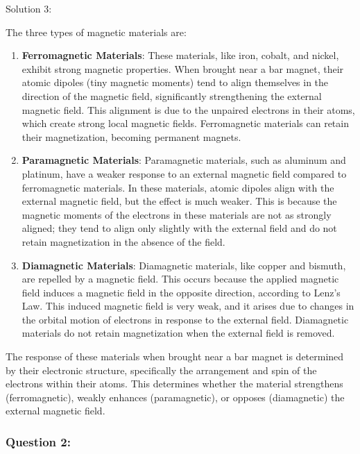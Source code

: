 \documentclass[a4paper,11pt]{article}
\begin{document}
\noindent Solution 3:

The three types of magnetic materials are:

\begin{enumerate}
    \item \textbf{Ferromagnetic Materials}: These materials, like iron, cobalt, and nickel, exhibit strong magnetic properties. When brought near a bar magnet, their atomic dipoles (tiny magnetic moments) tend to align themselves in the direction of the magnetic field, significantly strengthening the external magnetic field. This alignment is due to the unpaired electrons in their atoms, which create strong local magnetic fields. Ferromagnetic materials can retain their magnetization, becoming permanent magnets.
    
    \item \textbf{Paramagnetic Materials}: Paramagnetic materials, such as aluminum and platinum, have a weaker response to an external magnetic field compared to ferromagnetic materials. In these materials, atomic dipoles align with the external magnetic field, but the effect is much weaker. This is because the magnetic moments of the electrons in these materials are not as strongly aligned; they tend to align only slightly with the external field and do not retain magnetization in the absence of the field.
    
    \item \textbf{Diamagnetic Materials}: Diamagnetic materials, like copper and bismuth, are repelled by a magnetic field. This occurs because the applied magnetic field induces a magnetic field in the opposite direction, according to Lenz's Law. This induced magnetic field is very weak, and it arises due to changes in the orbital motion of electrons in response to the external field. Diamagnetic materials do not retain magnetization when the external field is removed.
\end{enumerate}

The response of these materials when brought near a bar magnet is determined by their electronic structure, specifically the arrangement and spin of the electrons within their atoms. This determines whether the material strengthens (ferromagnetic), weakly enhances (paramagnetic), or opposes (diamagnetic) the external magnetic field. 

\subsubsection*{Question 2:}
\end{document}
